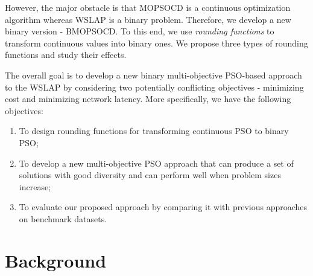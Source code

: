 \documentclass[10pt,journal,compsoc]{IEEEtran}
\begin{document}

However, the major obstacle is that MOPSOCD is a continuous optimization algorithm whereas WSLAP is a binary problem. Therefore, we develop a new binary version - BMOPSOCD. To this end, we use \emph{rounding functions} to transform continuous values into binary ones. We propose three types of rounding functions and study their effects. 


The overall goal is to develop a new binary multi-objective PSO-based approach to the WSLAP by considering two potentially conflicting objectives - minimizing cost and minimizing network latency. More specifically, we have the following objectives:
\begin{enumerate}
  \item To design rounding functions for transforming continuous PSO to binary PSO;
  \item To develop a new multi-objective PSO approach that can produce a set of solutions with good diversity and can perform well when problem sizes increase;
 \item To evaluate our proposed approach by comparing it with previous approaches on benchmark datasets.
\end{enumerate}



\vspace{-5 mm}

\section{Background}\label{sec:back}
\end{document}

